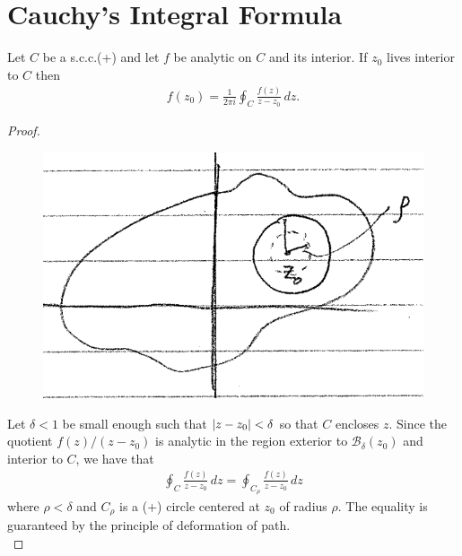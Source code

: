 \documentclass{article}
\theoremstyle{definition}
\newcommand{\f}[2]{\frac{#1}{#2}}
\newcommand{\B}{\mathcal{B}}
\begin{document}
\section{Cauchy's Integral Formula}

Let $C$ be a s.c.c.(+) and let $f$ be analytic on $C$ and its interior. If $z_0$ lives interior to $C$ then 
\begin{align}
f(z_0) = \f{1}{2\pi i}\oint_C \f{f(z)}{z-z_0}\,dz.
\end{align}

\begin{proof}
	\begin{figure}[!htb]
		\centering
		\includegraphics[scale=0.25]{cauchy1}
	\end{figure}

	Let $\delta < 1$ be small enough such that $\abs{z-z_0} < \delta$ so that $C$ encloses $z$. Since the quotient $f(z) / (z-z_0)$ is analytic in the region exterior to $\B_\delta(z_0)$ and interior to $C$, we have that
	\begin{align}
	\oint_C \f{f(z)}{z-z_0}\,dz = \oint_{C_\rho}\f{f(z)}{z-z_0}\,dz
	\end{align}
	where $\rho < \delta$ and $C_\rho$ is a (+) circle centered at $z_0$ of radius $\rho$. The equality is guaranteed by the principle of deformation of path. \\
	

\end{proof}
\end{document}

